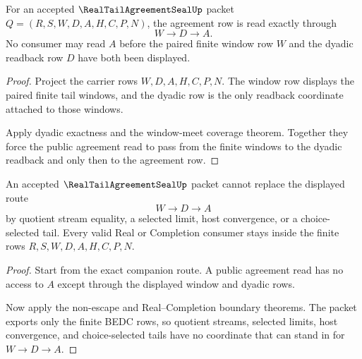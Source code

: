 \begin{theorem}
\label{thm:real-tail-agreement-seal-window-route-exact-companion}
For an accepted $\RealTailAgreementSealUp$ packet $Q=(R,S,W,D,A,H,C,P,N)$, the agreement row is read exactly through
$$
W \to D \to A.
$$
No consumer may read $A$ before the paired finite window row $W$ and the dyadic readback row $D$ have both been displayed.
\end{theorem}
\begin{proof}
Project the carrier rows $W,D,A,H,C,P,N$. The window row displays the paired finite tail windows, and the dyadic row is the only readback coordinate attached to those windows.

Apply dyadic exactness and the window-meet coverage theorem. Together they force the public agreement read to pass from the finite windows to the dyadic readback and only then to the agreement row.
\end{proof}

\begin{theorem}
\label{thm:real-tail-agreement-seal-window-route-nonescape-companion}
An accepted $\RealTailAgreementSealUp$ packet cannot replace the displayed route
$$
W \to D \to A
$$
by quotient stream equality, a selected limit, host convergence, or a choice-selected tail. Every valid Real or Completion consumer stays inside the finite rows $R,S,W,D,A,H,C,P,N$.
\end{theorem}
\begin{proof}
Start from the exact companion route. A public agreement read has no access to $A$ except through the displayed window and dyadic rows.

Now apply the non-escape and Real--Completion boundary theorems. The packet exports only the finite BEDC rows, so quotient streams, selected limits, host convergence, and choice-selected tails have no coordinate that can stand in for $W \to D \to A$.
\end{proof}



